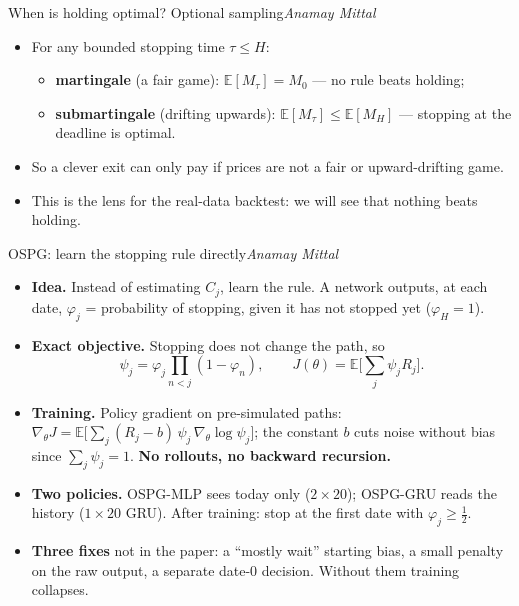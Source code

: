 \documentclass[aspectratio=169,11pt]{beamer}
\newcommand{\by}[1]{\hfill{\normalfont\small\itshape #1}}
\begin{document}
\begin{frame}{When is holding optimal? Optional sampling\by{Anamay Mittal}}
\begin{itemize}
\item For any bounded stopping time $\tau\le H$:
  \begin{itemize}
  \item \textbf{martingale} (a fair game): $\mathbb E[M_\tau]=M_0$ --- no rule beats holding;
  \item \textbf{submartingale} (drifting upwards): $\mathbb E[M_\tau]\le\mathbb E[M_H]$ ---
    stopping at the deadline is optimal.
  \end{itemize}
\item So a clever exit can only pay if prices are not a fair or upward-drifting game.
\item This is the lens for the real-data backtest: we will see that nothing beats holding.
\end{itemize}
\end{frame}

\begin{frame}{OSPG: learn the stopping rule directly\by{Anamay Mittal}}
\begin{itemize}
\item \textbf{Idea.} Instead of estimating $C_j$, learn the rule. A network outputs, at each date,
  $\varphi_j$ = probability of stopping, given it has not stopped yet ($\varphi_H=1$).
\item \textbf{Exact objective.} Stopping does not change the path, so
  \[\psi_j=\varphi_j\prod_{n<j}(1-\varphi_n),\qquad J(\theta)=\mathbb E\Big[\sum_{j}\psi_jR_j\Big].\]
\item \textbf{Training.} Policy gradient on pre-simulated paths:
  $\nabla_\theta J=\mathbb E\big[\sum_j(R_j-b)\,\psi_j\,\nabla_\theta\log\psi_j\big]$;
  the constant $b$ cuts noise without bias since $\sum_j\psi_j=1$.
  \textbf{No rollouts, no backward recursion.}
\item \textbf{Two policies.} OSPG-MLP sees today only ($2\times20$); OSPG-GRU reads the history
  ($1\times20$ GRU). After training: stop at the first date with $\varphi_j\ge\frac12$.
\item \textbf{Three fixes} not in the paper: a ``mostly wait'' starting bias, a small penalty on
  the raw output, a separate date-0 decision. Without them training collapses.
\end{itemize}
\end{frame}
\end{document}
